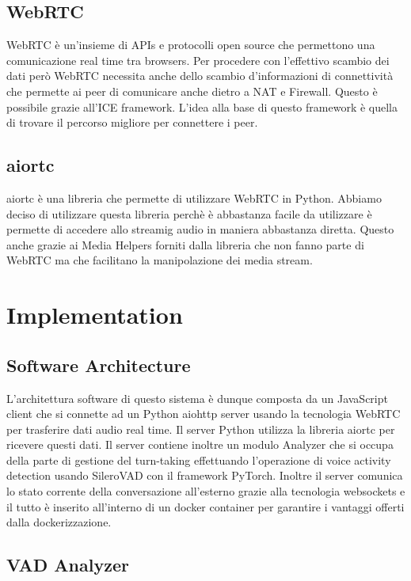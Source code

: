 \documentclass[12pt]{article}
\begin{document}
\subsection{WebRTC}

WebRTC è un'insieme di APIs e protocolli open source che permettono una comunicazione real time tra browsers.
Per procedere con l'effettivo scambio dei dati però WebRTC necessita anche dello scambio d'informazioni di connettività che permette ai peer di comunicare anche dietro a NAT e Firewall. Questo è possibile grazie all'ICE framework. L'idea alla base di questo framework è quella di trovare il percorso migliore per connettere i peer.

\subsection{aiortc}

aiortc è una libreria che permette di utilizzare WebRTC in Python. Abbiamo deciso di utilizzare questa libreria perchè è abbastanza facile da utilizzare è permette di accedere allo streamig audio in maniera abbastanza diretta. Questo anche grazie ai Media Helpers forniti dalla libreria che non fanno parte di WebRTC ma che facilitano la manipolazione dei media stream.

\section{Implementation}

\subsection{Software Architecture}

L'architettura software di questo sistema è dunque composta da un JavaScript client che si connette ad un Python aiohttp server usando la tecnologia WebRTC per trasferire dati audio real time. Il server Python utilizza la libreria aiortc per ricevere questi dati. Il server contiene inoltre un modulo Analyzer che si occupa della parte di gestione del turn-taking effettuando l'operazione di voice activity detection usando SileroVAD con il framework PyTorch. Inoltre il server comunica lo stato corrente della conversazione all'esterno grazie alla tecnologia websockets e il tutto è inserito all'interno di un docker container per garantire i vantaggi offerti dalla dockerizzazione.

\subsection{VAD Analyzer}
\end{document}
